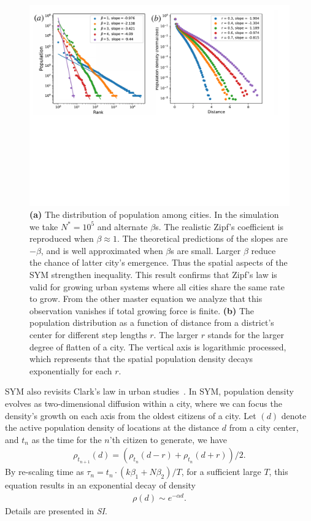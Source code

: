 \documentclass[reprint,unsortedaddress,amsmath,amssymb,aps,prl,showkeys]{revtex4-2}
\begin{document}
\begin{figure}[t]
	\centering
	\includegraphics[width = .99\linewidth]{pics/zipf_clark_new.pdf}
	\caption{\textbf{(a)} The distribution of population among cities. In the simulation we take $N^* = 10^5$ and alternate $\beta$s. The realistic Zipf's coefficient is reproduced when $\beta\approx 1$. The theoretical predictions of the slopes are $-\beta$, and is well approximated when $\beta$s are small. Larger $\beta$ reduce the chance of latter city's emergence. Thus the spatial aspects of the SYM strengthen inequality. This result confirms that Zipf's law is valid for growing urban systems where all cities share the same rate to grow. From the other master equation we analyze that this observation vanishes if total growing force is finite. \textbf{(b)} The population distribution as a function of distance from a district's center for different step lengths $r$. The larger $r$ stands for the larger degree of flatten of a city. The vertical axis is logarithmic processed, which represents that the spatial population density decays exponentially for each $r$.}
	\label{Fig2}
\end{figure}

SYM also revisits Clark's law in urban studies~\cite{clark1951urban}. In SYM, population density evolves as two-dimensional diffusion within a city\cite{doi:10.1137/0150099}, where we can focus the density's growth on each axis from the oldest citizens of a city. Let $
(d)$ denote the active population density of locations at the distance $d$ from a city center, and $t_n$ as the time for the $n$'th citizen to generate, we have 
\begin{align}
	\rho_{t_{n+1}}(d) = (\rho_{t_{n}}(d-r) + \rho_{t_{n}}(d+r) )/2.\label{loc_den}  
\end{align} By re-scaling time as $\tau_n = t_n\cdot (k\beta_1+N\beta_2)/T$, for a sufficient large $T$, this equation results in an exponential decay of density
\begin{align}
	\rho(d)\sim e^{-\alpha d}\label{clark_eq}.
\end{align} Details are presented in \textit{SI}. 
\end{document}
